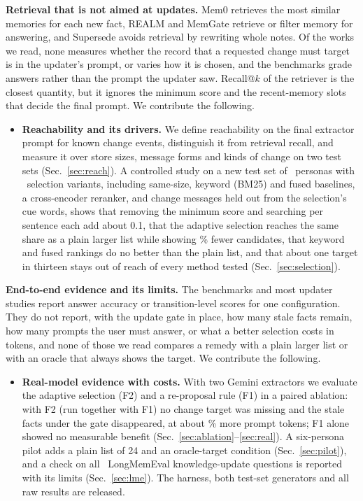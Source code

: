 \IfFileExists{IEEEtran.cls}{\documentclass[journal]{IEEEtran}\def\HAVEIEEE{1}}{\documentclass[10pt,twocolumn]{article}\usepackage[margin=0.7in,columnsep=0.25in]{geometry}}
\begin{document}
\textbf{Retrieval that is not aimed at updates.} Mem0 retrieves the most similar memories for each new fact, REALM and MemGate retrieve or filter memory for answering, and Supersede avoids retrieval by rewriting whole notes. Of the works we read, none measures whether the record that a requested change must target is in the updater's prompt, or varies how it is chosen, and the benchmarks grade answers rather than the prompt the updater saw. Recall@$k$ of the retriever is the closest quantity, but it ignores the minimum score and the recent-memory slots that decide the final prompt. We contribute the following.
\begin{itemize}
\item \textbf{Reachability and its drivers.} We define reachability on the final extractor prompt for known change events, distinguish it from retrieval recall, and measure it over store sizes, message forms and kinds of change on two test sets (Sec.~\ref{sec:reach}). A controlled study on a new test set of \selPersonas\ personas with \selNConditions\ selection variants, including same-size, keyword (BM25) and fused baselines, a cross-encoder reranker, and change messages held out from the selection's cue words, shows that removing the minimum score and searching per sentence each add about 0.1, that the adaptive selection reaches the same share as a plain larger list while showing \selCandSaving\% fewer candidates, that keyword and fused rankings do no better than the plain list, and that about one target in thirteen stays out of reach of every method tested (Sec.~\ref{sec:selection}).
\end{itemize}

\textbf{End-to-end evidence and its limits.} The benchmarks and most updater studies report answer accuracy or transition-level scores for one configuration. They do not report, with the update gate in place, how many stale facts remain, how many prompts the user must answer, or what a better selection costs in tokens, and none of those we read compares a remedy with a plain larger list or with an oracle that always shows the target. We contribute the following.
\begin{itemize}
\item \textbf{Real-model evidence with costs.} With two Gemini extractors we evaluate the adaptive selection (F2) and a re-proposal rule (F1) in a paired ablation: with F2 (run together with F1) no change target was missing and the stale facts under the gate disappeared, at about \tokInc\% more prompt tokens; F1 alone showed no measurable benefit (Sec.~\ref{sec:ablation}--\ref{sec:real}). A six-persona pilot adds a plain list of 24 and an oracle-target condition (Sec.~\ref{sec:pilot}), and a check on all \lmeQ\ LongMemEval knowledge-update questions is reported with its limits (Sec.~\ref{sec:lme}). The harness, both test-set generators and all raw results are released.
\end{itemize}
\end{document}
